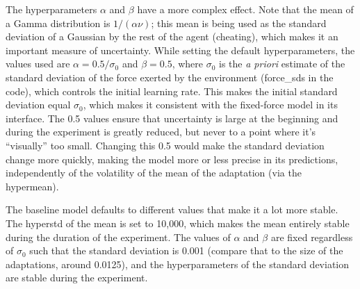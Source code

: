 \documentclass[a4paper,doc,floatsintext,natbib]{apa6}
\begin{document}
The hyperparameters $\alpha$ and $\beta$ have a more complex effect. Note that the
mean of a Gamma distribution is $1 / (\alpha \nu)$; this mean is being used
as the standard deviation of a Gaussian by the rest of the agent (cheating),
which makes it an important measure of uncertainty. While setting the default
hyperparameters, the values used are $\alpha = 0.5 / \sigma_0$ and
$\beta = 0.5$, where $\sigma_0$ is the \textit{a priori} estimate of the
standard deviation of the force exerted by the environment (force\_sds in the
code), which controls the initial learning rate. This makes the initial
standard deviation equal $\sigma_0$, which makes it consistent with the
fixed-force model in its interface. The 0.5 values ensure that uncertainty is
large at the beginning and during the experiment is greatly reduced, but never
to a point where it's ``visually'' too small. Changing this 0.5 would make the
standard deviation change more quickly, making the model more or less precise
in its predictions, independently of the volatility of the mean of the
adaptation (via the hypermean).

The baseline model defaults to different values that make it a lot more
stable. The hyperstd of the mean is set to 10,000, which makes the mean
entirely stable during the duration of the experiment. The values of $\alpha$
and $\beta$ are fixed regardless of $\sigma_0$ such that the standard deviation
is 0.001 (compare that to the size of the adaptations, around 0.0125), and the
hyperparameters of the standard deviation are stable during the experiment.



\end{document}
